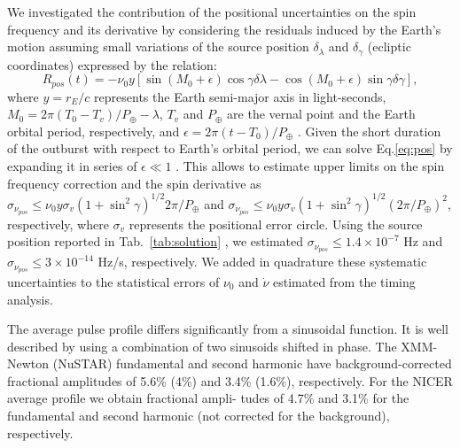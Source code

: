 \documentclass[fleqn,usenatbib]{mnras}
\begin{document}
We investigated the contribution of the positional uncertainties on the spin frequency and its derivative by considering the residuals induced by the Earth's motion assuming small variations of the source position $\delta_{\lambda}$ and $\delta_{\gamma}$ (ecliptic coordinates) expressed by the relation:
\begin{equation}
R_{pos}(t) = - \nu_0 y [\sin(M_0+\epsilon)\cos \gamma \delta\lambda -  \cos(M_0+\epsilon)\sin \gamma \delta\gamma],
\label{eq:pos}
\end{equation}
where $y=r_E/c$ represents the Earth semi-major axis in light-seconds, $M_0=2 \pi (T_0-T_{v})/P_{\oplus}-\lambda$, $T_{v}$ and $P_{\oplus}$ are the vernal point and the Earth orbital period, respectively, and $\epsilon=2\pi(t-T_0)/P_{\oplus}$ \citep[see, e.g.][]{Lyne90}. Given the short duration of the outburst with respect to Earth's orbital period, we can solve Eq.\ref{eq:pos} by expanding it in series of $\epsilon\ll1$ \cite[see e.g.][and references therein]{Burderi:2007tl}. This allows to estimate upper limits on the spin frequency correction and the spin derivative as $\sigma_{\nu_{pos}}\leq \nu_0y\sigma_{v}(1+\sin^2\gamma)^{1/2}2\pi/P_{\oplus}$ and $\sigma_{\dot{\nu}_{pos}}\leq \nu_0y\sigma_{v}(1+\sin^2\gamma)^{1/2}(2\pi/P_{\oplus})^2$, respectively, where $\sigma_{v}$ represents the positional error circle. Using the source position reported in Tab.~\ref{tab:solution} \citep{Jonker:2013wp}, we estimated $\sigma_{\nu_{pos}} \leq 1.4\times 10^{-7}$ Hz and $\sigma_{\dot{\nu}_{pos}} \leq 3\times 10^{-14}$ Hz/s, respectively. We added in quadrature these systematic uncertainties to the statistical errors of $\nu_0$ and $\dot{\nu}$ estimated from the timing analysis.

The average pulse profile differs significantly from a sinusoidal function. It is well described by using a combination of two sinusoids shifted in phase. The XMM-Newton (NuSTAR) fundamental and second harmonic have background-corrected fractional amplitudes of 5.6\% (4\%) and 3.4\% (1.6\%), respectively. For the NICER average profile we obtain fractional ampli- tudes of 4.7\% and 3.1\% for the fundamental and second harmonic (not corrected for the background), respectively.
\end{document}
